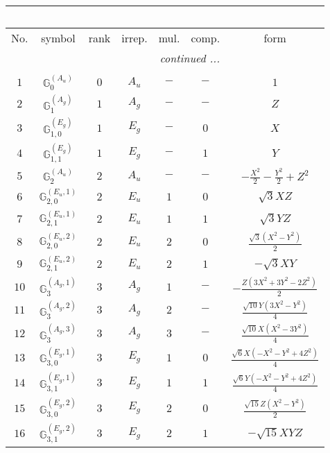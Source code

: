 \documentclass[fleqn,10pt,landscape]{article}
\begin{document}
\begin{itemize}
\begin{center}
\begin{longtable}{ccccccc}
\multicolumn{6}{l}{\tablename\ \thetable{}} \\
 \hline \hline
No. & symbol & rank & irrep. & mul. & comp. & form \\ \hline \endhead

 \hline \hline
\multicolumn{6}{r}{\footnotesize\it continued ...} \\ \endfoot

 \hline \hline
\multicolumn{6}{r}{} \\ \endlastfoot

$ 1 $ & $ \mathbb{G}_{0}^{(A_{u})} $ & $ 0 $ & $ A_{u} $ & $ - $ & $ - $ & $ 1 $ \\ \hline
$ 2 $ & $ \mathbb{G}_{1}^{(A_{g})} $ & $ 1 $ & $ A_{g} $ & $ - $ & $ - $ & $ Z $ \\
$ 3 $ & $ \mathbb{G}_{1,0}^{(E_{g})} $ & $ 1 $ & $ E_{g} $ & $ - $ & $ 0 $ & $ X $ \\
$ 4 $ & $ \mathbb{G}_{1,1}^{(E_{g})} $ & $ 1 $ & $ E_{g} $ & $ - $ & $ 1 $ & $ Y $ \\ \hline
$ 5 $ & $ \mathbb{G}_{2}^{(A_{u})} $ & $ 2 $ & $ A_{u} $ & $ - $ & $ - $ & $ - \frac{X^{2}}{2} - \frac{Y^{2}}{2} + Z^{2} $ \\
$ 6 $ & $ \mathbb{G}_{2,0}^{(E_{u},1)} $ & $ 2 $ & $ E_{u} $ & $ 1 $ & $ 0 $ & $ \sqrt{3} X Z $ \\
$ 7 $ & $ \mathbb{G}_{2,1}^{(E_{u},1)} $ & $ 2 $ & $ E_{u} $ & $ 1 $ & $ 1 $ & $ \sqrt{3} Y Z $ \\
$ 8 $ & $ \mathbb{G}_{2,0}^{(E_{u},2)} $ & $ 2 $ & $ E_{u} $ & $ 2 $ & $ 0 $ & $ \frac{\sqrt{3} \left(X^{2} - Y^{2}\right)}{2} $ \\
$ 9 $ & $ \mathbb{G}_{2,1}^{(E_{u},2)} $ & $ 2 $ & $ E_{u} $ & $ 2 $ & $ 1 $ & $ - \sqrt{3} X Y $ \\ \hline
$ 10 $ & $ \mathbb{G}_{3}^{(A_{g},1)} $ & $ 3 $ & $ A_{g} $ & $ 1 $ & $ - $ & $ - \frac{Z \left(3 X^{2} + 3 Y^{2} - 2 Z^{2}\right)}{2} $ \\
$ 11 $ & $ \mathbb{G}_{3}^{(A_{g},2)} $ & $ 3 $ & $ A_{g} $ & $ 2 $ & $ - $ & $ \frac{\sqrt{10} Y \left(3 X^{2} - Y^{2}\right)}{4} $ \\
$ 12 $ & $ \mathbb{G}_{3}^{(A_{g},3)} $ & $ 3 $ & $ A_{g} $ & $ 3 $ & $ - $ & $ \frac{\sqrt{10} X \left(X^{2} - 3 Y^{2}\right)}{4} $ \\
$ 13 $ & $ \mathbb{G}_{3,0}^{(E_{g},1)} $ & $ 3 $ & $ E_{g} $ & $ 1 $ & $ 0 $ & $ \frac{\sqrt{6} X \left(- X^{2} - Y^{2} + 4 Z^{2}\right)}{4} $ \\
$ 14 $ & $ \mathbb{G}_{3,1}^{(E_{g},1)} $ & $ 3 $ & $ E_{g} $ & $ 1 $ & $ 1 $ & $ \frac{\sqrt{6} Y \left(- X^{2} - Y^{2} + 4 Z^{2}\right)}{4} $ \\
$ 15 $ & $ \mathbb{G}_{3,0}^{(E_{g},2)} $ & $ 3 $ & $ E_{g} $ & $ 2 $ & $ 0 $ & $ \frac{\sqrt{15} Z \left(X^{2} - Y^{2}\right)}{2} $ \\
$ 16 $ & $ \mathbb{G}_{3,1}^{(E_{g},2)} $ & $ 3 $ & $ E_{g} $ & $ 2 $ & $ 1 $ & $ - \sqrt{15} X Y Z $ \\
\end{longtable}
\end{center}


\end{itemize}
\end{document}
